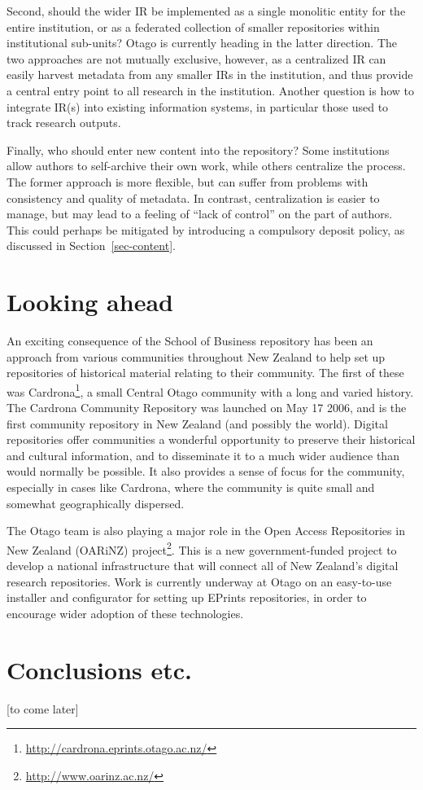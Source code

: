 \documentclass[12pt,pdftex,a4paper,titlepage]{article}
\begin{document}
Second, should the wider IR be implemented as a single monolitic entity for the entire institution, or as a federated collection of smaller repositories within institutional sub-units? Otago is currently heading in the latter direction. The two approaches are not mutually exclusive, however, as a centralized IR can easily harvest metadata from any smaller IRs in the institution, and thus provide a central entry point to all research in the institution. Another question is how to integrate IR(s) into existing information systems, in particular those used to track research outputs.

Finally, who should enter new content into the repository? Some institutions allow authors to self-archive their own work, while others centralize the process. The former approach is more flexible, but can suffer from problems with consistency and quality of metadata. In contrast, centralization is easier to manage, but may lead to a feeling of ``lack of control'' on the part of authors. This could perhaps be mitigated by introducing a compulsory deposit policy, as discussed in Section~\ref{sec-content}.


\section{Looking ahead}

An exciting consequence of the School of Business repository has been an approach from various communities throughout New Zealand to help set up repositories of historical material relating to their community. The first of these was Cardrona\footnote{\url{http://cardrona.eprints.otago.ac.nz/}}, a small Central Otago community with a long and varied history. The Cardrona Community Repository was launched on May 17 2006, and is the first community repository in New Zealand (and possibly the world). Digital repositories offer communities a wonderful opportunity to preserve their historical and cultural information, and to disseminate it to a much wider audience than would normally be possible. It also provides a sense of focus for the community, especially in cases like Cardrona, where the community is quite small and somewhat geographically dispersed.

The Otago team is also playing a major role in the Open Access Repositories in New Zealand (OARiNZ) project\footnote{\url{http://www.oarinz.ac.nz/}}. This is a new government-funded project to develop a national infrastructure that will connect all of New Zealand's digital research repositories. Work is currently underway at Otago on an easy-to-use installer and configurator for setting up EPrints repositories, in order to encourage wider adoption of these technologies.



\section{Conclusions etc.}

[to come later]



\end{document}
